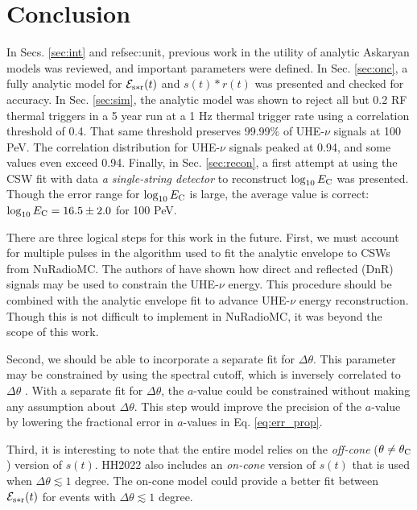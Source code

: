 \documentclass[amsmath,amssymb,aps,prd,10pt,twocolumn,showkeys]{revtex4}
\begin{document}
\section{Conclusion}
\label{sec:conc}

In Secs. \ref{sec:int} and ref{sec:unit}, previous work in the utility of analytic Askaryan models was reviewed, and important parameters were defined.  In Sec. \ref{sec:onc}, a fully analytic model for $\mathcal{E}_{\rm s*r}(t)$ and $s(t) * r(t)$ was presented and checked for accuracy.  In Sec. \ref{sec:sim}, the analytic model was shown to reject all but 0.2 RF thermal triggers in a 5 year run at a 1 Hz thermal trigger rate using a correlation threshold of 0.4.  That same threshold preserves 99.99\% of UHE-$\nu$ signals at 100 PeV.  The correlation distribution for UHE-$\nu$ signals peaked at 0.94, and some values even exceed 0.94.  Finally, in Sec. \ref{sec:recon}, a first attempt at using the CSW fit with data \textit{a single-string detector} to reconstruct $\log_{10}E_{\rm C}$ was presented.  Though the error range for $\log_{10}E_{\rm C}$ is large, the average value is correct: $\log_{10}E_{\rm C} = 16.5 \pm 2.0$ for 100 PeV.

There are three logical steps for this work in the future.  First, we must account for multiple pulses in the algorithm used to fit the analytic envelope to CSWs from NuRadioMC.  The authors of \cite{anker2019neutrino-734} have shown how direct and reflected (DnR) signals may be used to constrain the UHE-$\nu$ energy.  This procedure should be combined with the analytic envelope fit to advance UHE-$\nu$ energy reconstruction.  Though this is not difficult to implement in NuRadioMC, it was beyond the scope of this work.

Second, we should be able to incorporate a separate fit for $\Delta\theta$.  This parameter may be constrained by using the spectral cutoff, which is inversely correlated to $\Delta\theta$ \cite{10.1016/j.astropartphys.2017.03.008}.  With a separate fit for $\Delta\theta$, the $a$-value could be constrained without making any assumption about $\Delta\theta$.  This step would improve the precision of the $a$-value by lowering the fractional error in $a$-values in Eq. \ref{eq:err_prop}.

Third, it is interesting to note that the entire model relies on the \textit{off-cone} ($\theta \neq \theta_{\rm C}$) version of $s(t)$.  HH2022 also includes an \textit{on-cone} version of $s(t)$ that is used when $\Delta\theta \lesssim 1$ degree.  The on-cone model could provide a better fit between $\mathcal{E}_{\rm s*r}(t)$ for events with $\Delta\theta \lesssim 1$ degree.
\end{document}
